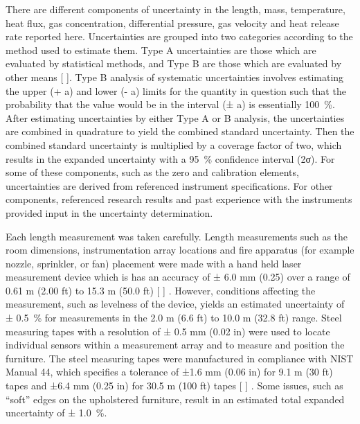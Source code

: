 \documentclass[12pt,oneside]{book}
\begin{document}
There are different components of uncertainty in the length, mass, temperature, heat flux, gas concentration, differential pressure, gas velocity and heat release rate reported here. Uncertainties are grouped into two categories according to the method used to estimate them. Type A uncertainties are those which are evaluated by statistical methods, and Type B are those which are evaluated by other means  [ ]. Type B analysis of systematic uncertainties involves estimating the upper (+ a) and lower (- a) limits for the quantity in question such that the probability that the value would be in the interval (± a) is essentially 100~\%. After estimating uncertainties by either Type A or B analysis, the uncertainties are combined in quadrature to yield the combined standard uncertainty. Then the combined standard uncertainty is multiplied by a coverage factor of two, which results in the expanded uncertainty with a 95~\% confidence interval (2σ).  For some of these components, such as the zero and calibration elements, uncertainties are derived from referenced instrument specifications. For other components, referenced research results and past experience with the instruments provided input in the uncertainty determination. 

Each length measurement was taken carefully. Length measurements such as the room dimensions, instrumentation array locations and fire apparatus (for example nozzle, sprinkler, or fan) placement were made with a hand held laser measurement device which is has an accuracy of ± 6.0 mm (0.25) over a range of 0.61 m (2.00 ft) to 15.3 m (50.0 ft) [ ] .  However, conditions affecting the measurement, such as levelness of the device, yields an estimated uncertainty of ± 0.5~\% for measurements in the 2.0 m (6.6 ft) to 10.0 m (32.8 ft) range.  Steel measuring tapes with a resolution of  ± 0.5 mm (0.02 in) were used to locate individual sensors within a measurement array and to measure and position the furniture. The steel measuring tapes were manufactured in compliance with NIST Manual 44, which specifies a tolerance of ±1.6 mm (0.06 in) for 9.1 m (30 ft) tapes and ±6.4 mm (0.25 in) for 30.5 m (100 ft) tapes [ ] .  Some issues, such as “soft” edges on the upholstered furniture, result in an estimated total expanded uncertainty of  ± 1.0~\%. 
\end{document}
